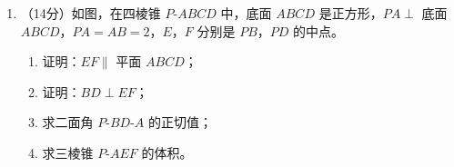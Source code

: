 \documentclass[12pt, a4paper]{ctexart}
\begin{document}
\begin{enumerate}[resume]
\item （14分）如图，在四棱锥 $P\text{-}ABCD$ 中，底面 $ABCD$ 是正方形，$PA\perp$ 底面 $ABCD$，$PA=AB=2$，$E$，$F$ 分别是 $PB$，$PD$ 的中点。
\begin{enumerate}[label=(\arabic*)]
\item 证明：$EF\parallel$ 平面 $ABCD$；
\item 证明：$BD\perp EF$；
\item 求二面角 $P\text{-}BD\text{-}A$ 的正切值；
\item 求三棱锥 $P\text{-}AEF$ 的体积。
\end{enumerate}
\end{enumerate}
\end{document}

